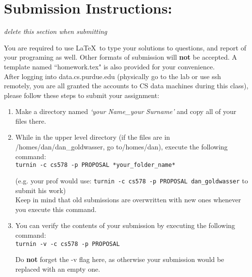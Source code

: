 \documentclass[11pt]{article}
\begin{document}
\section*{Submission Instructions:} 
\textit{delete this section when submitting}

You are required to use \LaTeX \, to type your solutions to questions, and report of your programing as well. Other formats of submission will \textbf{not} be accepted. A template named ``homework.tex" is also provided for your convenience.\\

After logging into data.cs.purdue.edu (physically go to the lab or use ssh remotely, you are all granted the accounts to CS data machines during this class), please follow these steps to submit your assignment:
\begin{enumerate}
	\item Make a directory named \textit{`your Name\_your Surname'} and copy all of your files there.
	\item While in the upper level directory (if the files are in /homes/dan/dan\_goldwasser, go to/homes/dan), execute the following command:\\

	\texttt{turnin -c cs578 -p PROPOSAL *your\_folder\_name*}
		
	(e.g. your prof would use: \texttt{turnin -c cs578 -p PROPOSAL dan\_goldwasser} to submit his work)\\
		
	Keep in mind that old submissions are overwritten with new ones whenever you execute this
command.\\

	\item You can verify the contents of your submission by executing the following command:\\
	
	\texttt{turnin -v -c cs578 -p PROPOSAL\\}

	Do \textbf{not} forget the -v flag here, as otherwise your submission would be replaced with an empty
one.
\end{enumerate}

%
%
\end{document}
